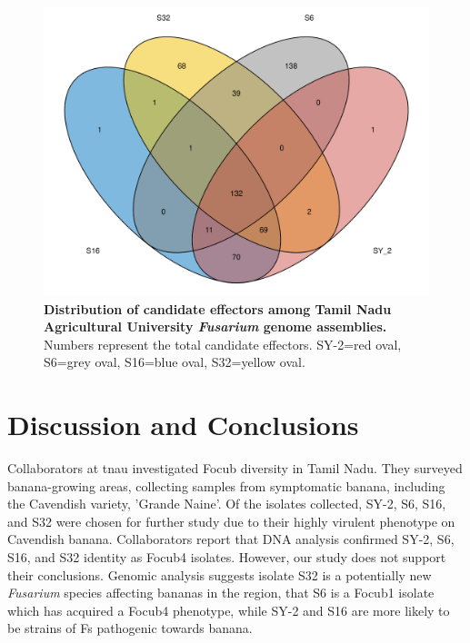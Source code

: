 \begin{figure}[h!]
  \centering
  \includegraphics[width=12cm]{Figures/sharedCandEffsVenn.png}
  \caption[Distribution of candidate effectors among Tamil Nadu Agricultural University \textit{Fusarium} genome assemblies.]{\textbf{Distribution of candidate effectors among Tamil Nadu Agricultural University \textit{Fusarium} genome assemblies.} Numbers represent the total candidate effectors. SY-2=red oval, S6=grey oval, S16=blue oval, S32=yellow oval.}
  \label{fig:TNAUVenn}
\end{figure}

\newpage
\section{Discussion and Conclusions}

Collaborators at \ac{tnau}  investigated \ac{Focub} diversity in Tamil Nadu. They surveyed banana-growing areas, collecting samples from symptomatic banana, including the Cavendish variety, 'Grande Naine'. Of the isolates collected, SY-2, S6, S16, and S32 were chosen for further study due to their highly virulent phenotype on Cavendish banana. Collaborators report that DNA analysis confirmed SY-2, S6, S16, and S32 identity as \ac{Focub4} isolates. However, our study does not support their conclusions. Genomic analysis suggests isolate S32 is a potentially new \textit{Fusarium} species affecting bananas in the region, that S6 is a \ac{Focub1} isolate which has acquired a \ac{Focub4} phenotype, while SY-2 and S16 are more likely to be strains of \ac{Fs} pathogenic towards banana.

